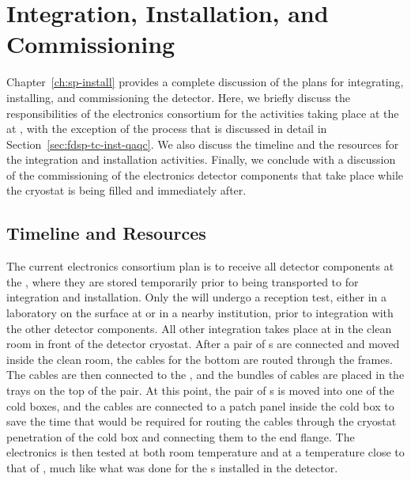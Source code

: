 \section{Integration, Installation, and Commissioning}
\label{sec:fdsp-tpcelec-integration}

Chapter~\ref{ch:sp-install} provides a complete discussion of the plans for 
integrating, installing, and commissioning the detector.
Here, we briefly discuss the responsibilities of the  electronics
consortium for the activities taking place at the
at , with the exception of the  process that
is discussed in detail in Section~\ref{sec:fdsp-tc-inst-qaqc}. We also discuss the timeline
and the resources for the integration and installation activities.
Finally, we conclude with a discussion of the commissioning
of the  electronics detector components that take place while
the cryostat is being filled and immediately after. 

\subsection{Timeline and Resources}
\label{sec:fdsp-tpcelec-integration-timeline}

The current  electronics consortium plan is to receive all detector 
components at the , where they are stored temporarily
prior to being transported to  for integration and 
installation. Only the  will undergo a reception test,
either in a laboratory on the surface at  or in a nearby
institution, prior to integration with the other  
detector components. All other integration takes place at  in the clean room
in front of the detector cryostat. After a pair of s are 
connected and moved inside the clean room, the  cables
for the bottom  are routed through the  frames.
The cables are then connected to the , and the bundles
of cables are placed in the trays on the top of the  pair.
At this point, the pair of s is moved into one of the cold
boxes, and the cables are connected to a patch panel inside the cold box
to save the time that would be required for routing the cables through the cryostat
penetration of the cold box and connecting them to the end flange.
The  electronics is then tested at both room temperature
and at a temperature close to that of \lntwo, much like
what was done for the s installed in the  detector.


